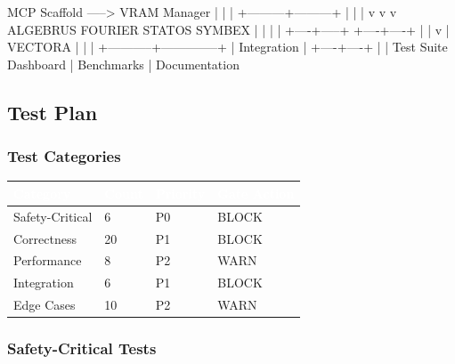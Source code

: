 \documentclass[11pt,letterpaper]{article}
\newcommand{\tableheader}[1]{\textbf{\sffamily\textcolor{white}{#1}}}
\begin{document}
\begin{asciibox}
    MCP Scaffold -----> VRAM Manager
         |                    |
         |          +---------+---------+
         |          |                   |
         v          v                   v
    ALGEBRUS    FOURIER          STATOS    SYMBEX
         |          |               |         |
         +----+-----+               +----+----+
              |                          |
              v                          |
          VECTORA                        |
              |                          |
              +-----------+--------------+
                          |
                     Integration
                          |
                     +----+----+
                     |         |
                Test Suite   Dashboard
                     |
                Benchmarks
                     |
               Documentation
\end{asciibox}

\subsection{Test Plan}

\subsubsection{Test Categories}

\begin{center}
\begin{tabularx}{\textwidth}{L{3cm}C{1.5cm}C{1.5cm}C{2cm}}
\toprule
{}
\tableheader{Category} & \tableheader{Count} & \tableheader{Priority} & \tableheader{Gate Action} \\
\midrule
Safety-Critical & 6 & P0 & BLOCK \\
Correctness & 20 & P1 & BLOCK \\
Performance & 8 & P2 & WARN \\
Integration & 6 & P1 & BLOCK \\
Edge Cases & 10 & P2 & WARN \\
\bottomrule
\end{tabularx}
\end{center}

\subsubsection{Safety-Critical Tests}
\end{document}
